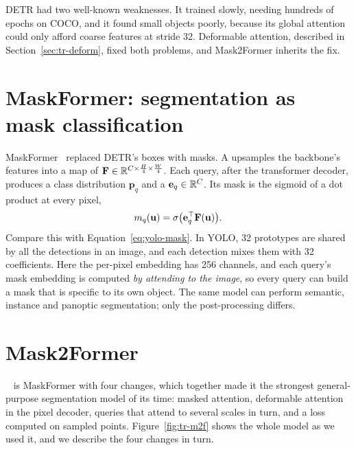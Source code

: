 DETR had two well-known weaknesses. It trained slowly, needing hundreds of epochs on COCO, and it
found small objects poorly, because its global attention could only afford coarse features at stride
32. Deformable attention, described in Section~\ref{sec:tr-deform}, fixed both problems, and
Mask2Former inherits the fix.

\section{MaskFormer: segmentation as mask classification}\label{sec:tr-maskformer}
MaskFormer~\citep{maskformer} replaced DETR's boxes with masks. A  upsamples
the backbone's features into a map of 
$\mathbf{F}\in\mathbb{R}^{C\times\frac H4\times\frac W4}$. Each query, after the transformer decoder, produces
a class distribution $\mathbf{p}_q$ and a  $\mathbf{e}_q\in\mathbb{R}^{C}$. Its mask
is the sigmoid of a dot product at every pixel,
\begin{equation}
m_q(\mathbf{u}) = \sigma\big(\mathbf{e}_q^{\top}\mathbf{F}(\mathbf{u})\big).
\label{eq:tr-mask}
\end{equation}
Compare this with Equation~\eqref{eq:yolo-mask}. In YOLO, 32 prototypes are
shared by all the detections in an image, and each detection mixes them with 32 coefficients. Here the
per-pixel embedding has 256 channels, and each query's mask embedding is computed \emph{by attending
to the image}, so every query can build a mask that is specific to its own object. The same model can
perform semantic, instance and panoptic segmentation; only the post-processing differs.

\section{Mask2Former}\label{sec:tr-m2f}
~\citep{mask2former} is MaskFormer with four changes, which together made it the
strongest general-purpose segmentation model of its time: masked attention, deformable attention in
the pixel decoder, queries that attend to several scales in turn, and a loss computed on sampled
points. Figure~\ref{fig:tr-m2f} shows the whole model as we used it, and we describe the four changes
in turn.

